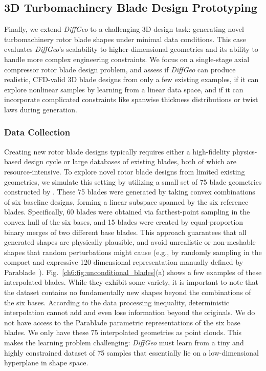 \subsection{3D Turbomachinery Blade Design Prototyping}
\label{ch6:sec:turbine}

Finally, we extend \textit{DiffGeo} to a challenging 3D design task: generating novel turbomachinery rotor blade shapes under minimal data conditions. This case evaluates \textit{DiffGeo}’s scalability to higher-dimensional geometries and its ability to handle more complex engineering constraints. We focus on a single-stage axial compressor rotor blade design problem, and assess if \textit{DiffGeo} can produce realistic, CFD-valid 3D blade designs from only a few existing examples, if it can explore nonlinear samples by learning from a linear data space, and if it can incorporate complicated constraints like spanwise thickness distributions or twist laws during generation.

\subsubsection{Data Collection}
Creating new rotor blade designs typically requires either a high-fidelity physics-based design cycle or large databases of existing blades, both of which are resource-intensive. To explore novel rotor blade designs from limited existing geometries, we simulate this setting by utilizing a small set of 75 blade geometries constructed by \citet{aa.Fesquet2024}. These 75 blades were generated by taking convex combinations of six baseline designs, forming a linear subspace spanned by the six reference blades. Specifically, 60 blades were obtained via farthest-point sampling in the convex hull of the six bases, and 15 blades were created by equal-proportion binary merges of two different base blades. This approach guarantees that all generated shapes are physically plausible, and avoid unrealistic or non-meshable shapes that random perturbations might cause (e.g., by randomly sampling in the compact and expressive 120-dimensional representation manually defined by Parablade~\cite{aa.Agromayor2021}). Fig.~\ref{ch6:fig:unconditional_blades}(a) shows a few examples of these interpolated blades. While they exhibit some variety, it is important to note that the dataset contains no fundamentally new shapes beyond the combinations of the six bases. According to the data processing inequality, deterministic interpolation cannot add and even lose information beyond the originals. We do not have access to the Parablade parametric representations of the six base blades. We only have these 75 interpolated geometries as point clouds. This makes the learning problem challenging: \textit{DiffGeo} must learn from a tiny and highly constrained dataset of 75 samples that essentially lie on a low-dimensional hyperplane in shape space.

